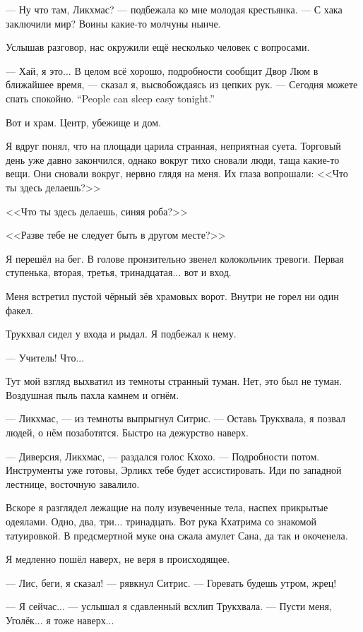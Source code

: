 --- Ну что там, Ликхмас? --- подбежала ко мне молодая крестьянка.
--- С хака заключили мир?
Воины какие-то молчуны нынче.

Услышав разговор, нас окружили ещё несколько человек с вопросами.

--- Хай, я это...
В целом всё хорошо, подробности сообщит Двор Люм в ближайшее время, --- сказал я, высвобождаясь из цепких рук.
{--- Сегодня можете спать спокойно.}
{``People can sleep easy tonight.''}

Вот и храм.
Центр, убежище и дом.

Я вдруг понял, что на площади царила странная, неприятная суета.
Торговый день уже давно закончился, однако вокруг тихо сновали люди, таща какие-то вещи.
Они сновали вокруг, нервно глядя на меня.
Их глаза вопрошали: <<Что ты здесь делаешь?>>

<<Что ты здесь делаешь, синяя роба?>>

<<Разве тебе не следует быть в другом месте?>>

Я перешёл на бег.
В голове пронзительно звенел колокольчик тревоги.
Первая ступенька, вторая, третья, тринадцатая... вот и вход.

Меня встретил пустой чёрный зёв храмовых ворот.
Внутри не горел ни один факел.

Трукхвал сидел у входа и рыдал.
Я подбежал к нему.

--- Учитель! Что...

Тут мой взгляд выхватил из темноты странный туман.
Нет, это был не туман.
Воздушная пыль пахла камнем и огнём.

--- Ликхмас, --- из темноты выпрыгнул Ситрис.
--- Оставь Трукхвала, я позвал людей, о нём позаботятся.
Быстро на дежурство наверх.

--- Диверсия, Ликхмас, --- раздался голос Кхохо.
--- Подробности потом.
Инструменты уже готовы, Эрликх тебе будет ассистировать.
Иди по западной лестнице, восточную завалило.

Вскоре я разглядел лежащие на полу изувеченные тела, наспех прикрытые одеялами.
Одно, два, три... тринадцать.
Вот рука Кхатрима со знакомой татуировкой.
В предсмертной муке она сжала амулет Сана, да так и окоченела.

Я медленно пошёл наверх, не веря в происходящее.

--- Лис, беги, я сказал! --- рявкнул Ситрис.
--- Горевать будешь утром, жрец!

--- Я сейчас... --- услышал я сдавленный всхлип Трукхвала.
--- Пусти меня, Уголёк... я тоже наверх...

